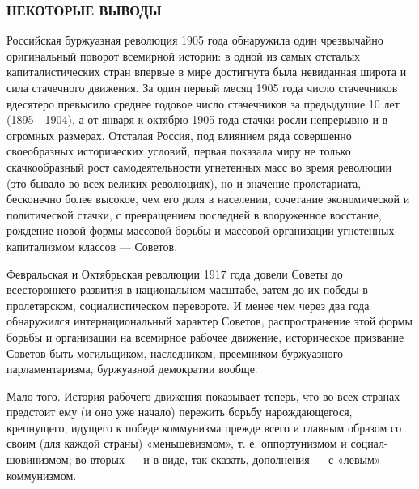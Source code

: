 \documentclass[12pt]{article}
\newcommand{\parnum}{(\arabic{parcount})}
\newcounter{parcount}
\newenvironment{parnumbers}{%
  \par%
  \everypar{\noindent \stepcounter{parcount}\marginpar[]{\parnum}}%
}{}
\begin{document}
\subsubsection*{НЕКОТОРЫЕ ВЫВОДЫ}

\begin{parnumbers}
Российская буржуазная революция 1905 года обнаружила один чрезвычайно оригинальный поворот всемирной истории: в одной из самых отсталых капиталистических стран впервые в мире достигнута была невиданная широта и сила стачечного движения. За один первый месяц 1905 года число стачечников вдесятеро превысило среднее годовое число стачечников за предыдущие 10 лет (1895—1904), а от января к октябрю 1905 года стачки росли непрерывно и в огромных размерах. Отсталая Россия, под влиянием ряда совершенно своеобразных исторических условий, первая показала миру не только скачкообразный рост самодеятельности угнетенных масс во время революции (это бывало во всех великих революциях), но и значение пролетариата, бесконечно более высокое, чем его доля в населении, сочетание экономической и политической стачки, с превращением последней в вооруженное восстание, рождение новой формы массовой борьбы и массовой организации угнетенных капитализмом классов — Советов.

Февральская и Октябрьская революции 1917 года довели Советы до всестороннего развития в национальном масштабе, затем до их победы в пролетарском, социалистическом перевороте. И менее чем через два года обнаружился интернациональный характер Советов, распространение этой формы борьбы и организации на всемирное рабочее движение, историческое призвание Советов быть могильщиком, наследником, преемником буржуазного парламентаризма, буржуазной демократии вообще.

Мало того. История рабочего движения показывает теперь, что во всех странах предстоит ему (и оно уже начало) пережить борьбу нарождающегося, крепнущего, идущего к победе коммунизма прежде всего и главным образом со своим (для каждой страны) «меньшевизмом», т. е. оппортунизмом и социал-шовинизмом; во-вторых — и в виде, так сказать, дополнения — с «левым» коммунизмом.


\end{parnumbers}
\end{document}
